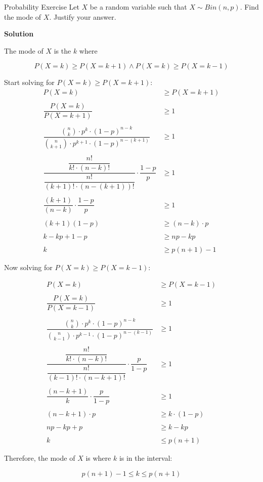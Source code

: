 \documentclass[12pt, a4paper]{article}
\begin{document}
\thispagestyle{fancy}

\begin{exercisebox}{Probability Exercise}
    Let $X$ be a random variable such that $X \sim Bin(n, p)$. Find the mode of $X$. Justify your answer.
\end{exercisebox}

\textbf{Solution}

The mode of $X$ is the $k$ where

\[
P(X=k) \geq P(X=k+1) \land  P(X=k) \geq P(X=k-1)
\]

Start solving for $P(X=k) \geq P(X=k+1)$:
$$
\begin{aligned}
    P(X=k) &\geq P(X=k+1)\\\\
    \dfrac{P(X=k)}{P(X=k+1)}
    &\geq1\\\\
    \dfrac{\binom{n}{k}\cdot p^k \cdot (1-p)^{n-k}}
    {\binom{n}{k+1}\cdot p^{k+1} \cdot (1-p)^{n-(k+1)}}
    &\geq1\\\\
    \dfrac{\dfrac{n!}{k!\cdot (n-k)!}}
    {\dfrac{n!}{(k+1)!\cdot (n-(k+1))!}}
    \cdot 
    \dfrac{1-p}{p}
    &\geq1\\\\
    \dfrac{(k+1)}{(n-k)}
    \cdot 
    \dfrac{1-p}{p}
    &\geq1\\\\
    (k+1)(1-p) &\geq (n-k)\cdot p\\\\
    k - kp + 1 - p &\geq np - kp\\\\
    k &\geq p(n+1) - 1
\end{aligned}
$$

Now solving for $P(X=k) \geq P(X=k-1)$:

$$
\begin{aligned}
    P(X=k) &\geq P(X=k-1)\\\\
    \dfrac{P(X=k)}{P(X=k-1)}
    &\geq1\\\\
    \dfrac{\binom{n}{k}\cdot p^k \cdot (1-p)^{n-k}}
    {\binom{n}{k-1}\cdot p^{k-1} \cdot (1-p)^{n-(k-1)}}
    &\geq1\\\\
    \dfrac{\dfrac{n!}{k!\cdot (n-k)!}}
    {\dfrac{n!}{(k-1)!\cdot (n-k+1)!}}
    \cdot 
    \dfrac{p}{1-p}
    &\geq1\\\\
    \dfrac{(n-k+1)}{k}
    \cdot 
    \dfrac{p}{1-p}
    &\geq1\\\\
    (n-k+1)\cdot p &\geq k\cdot(1-p)\\\\
    np - kp + p &\geq k - kp\\\\
    k &\leq p(n+1)
\end{aligned}
$$



Therefore, the mode of $X$ is where $k$ is in the interval:

$$\boxed{p(n+1) - 1 \leq k \leq p(n+1)}$$
\end{document}
